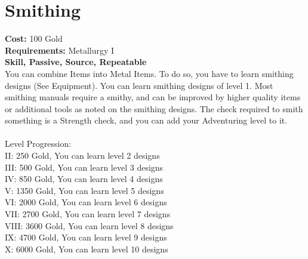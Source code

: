 \section{Smithing}
\textbf{Cost:} 100 Gold\\
\textbf{Requirements:} Metallurgy I\\
\textbf{Skill, Passive, Source, Repeatable}\\
You can combine Items into Metal Items. To do so, you have to learn smithing designs (See Equipment). You can learn smithing designs of level 1. Most smithing manuals require a smithy, and can be improved by higher quality items or additional tools as noted on the smithing designs. The check required to smith something is a Strength check, and you can add your Adventuring level to it.\\
\\
Level Progression:\\
II: 250 Gold, You can learn level 2 designs\\
III: 500 Gold, You can learn level 3 designs\\
IV: 850 Gold, You can learn level 4 designs\\
V: 1350 Gold, You can learn level 5 designs\\
VI: 2000 Gold, You can learn level 6 designs\\
VII: 2700 Gold, You can learn level 7 designs\\
VIII: 3600 Gold, You can learn level 8 designs\\
IX: 4700 Gold, You can learn level 9 designs\\
X: 6000 Gold, You can learn level 10 designs\\